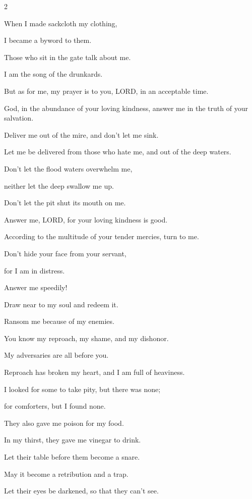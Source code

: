 \begin{multicols}{2}
	
	\myverse{}When I made sackcloth my clothing,
	
	I became a byword to them.
	
	
	\myverse{}Those who sit in the gate talk about me.
	
	I am the song of the drunkards.
	
	
	\myverse{}But as for me, my prayer is to you, LORD, in an acceptable
	time.
	
	God, in the abundance of your loving kindness, answer me in the truth of your
	salvation.
	
	
	\myverse{}Deliver me out of the mire, and don’t let me sink.
	
	Let me be delivered from those who hate me, and out of the deep waters.
	
	
	\myverse{}Don’t let the flood waters overwhelm me,
	
	neither let the deep swallow me up.
	
	Don’t let the pit shut its mouth on me.
	
	
	\myverse{}Answer me, LORD, for your loving kindness is good.
	
	According to the multitude of your tender mercies, turn to me.
	
	
	\myverse{}Don’t hide your face from your servant,
	
	for I am in distress.
	
	Answer me speedily!
	
	
	\myverse{}Draw near to my soul and redeem it.
	
	Ransom me because of my enemies.
	
	
	\myverse{}You know my reproach, my shame, and my dishonor.
	
	My adversaries are all before you.
	
	
	\myverse{}Reproach has broken my heart, and I am full of heaviness.
	
	I looked for some to take pity, but there was none;
	
	for comforters, but I found none.
	
	
	\myverse{}They also gave me poison for my food.
	
	In my thirst, they gave me vinegar to drink.
	
	
	\myverse{}Let their table before them become a snare.
	
	May it become a retribution and a trap.
	
	
	\myverse{}Let their eyes be darkened, so that they can’t see.
	

\end{multicols}
